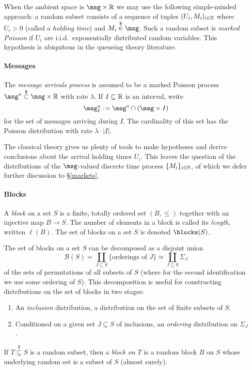\documentclass[a4paper,11pt]{article}
\begin{document}
When the ambient space is $\msg\times\R$ we may use the following simple-minded approach: a random subset consists of a sequence of tuples $(U_i,M_i)_{i\in\mathbb N}$ where $U_i>0$ (called a \emph{holding time}) and $M_i\stackrel{\$}{\in} \msg$.
%
Such a random subset is \emph{marked Poisson} if $U_i$ are i.i.d.~exponentially distributed random variables.
%
This hypothesis is ubiquitous in the queueing theory literature.

\paragraph{Messages}
The \emph{message arrivals process} is assumed to be a marked Poisson process $\msg^a\stackrel{\$}{\subset} \msg\times\R$ with rate $\lambda$.
%
If $I\subseteq\mathbb R$ is an interval, write 
\[
  \msg^a_I\defeq \msg^a\cap (\msg\times I)
\]
for the set of messages arriving during $I$. The cardinality of this set has the Poisson distribution with rate $\lambda\cdot|I|$.

The classical theory gives us plenty of tools to make hypotheses and derive conclusions about the arrival holding times $U_i$. This leaves the question of the distributions of the $\msg$-valued discrete time process $\{M_i\}_{i\in\mathbb N}$, of which we defer further discussion to \S\ref{markets}.

\paragraph{Blocks}

\begin{definition}[Blocks]
  
  A \emph{block} on a set $S$ is a finite, totally ordered set $(B,\leq)$ together with an injective map $B\rightarrow S$. The number of elements in a block is called its \emph{length}, written $\ell(B)$. The set of blocks on a set $S$ is denoted $\blocks(S)$.

\end{definition}  

The set of blocks on a set $S$ can be decomposed as a disjoint union
\[
  \mathcal{B}(S) = \coprod_{J\subseteq S}\{\text{orderings of }J\} \simeq \coprod_{J\subseteq S}\Sigma_J
\]
of the sets of permutations of all subsets of $S$ (where for the second identification we use some ordering of $S$). This decomposition is useful for constructing distributions on the set of blocks in two stages:
\begin{enumerate}
  \item An \emph{inclusion} distribution, a distribution on the set of finite subsets of $S$.
  \item Conditioned on a given set $J\subseteq S$ of inclusions, an \emph{ordering} distribution on $\Sigma_J$.
\end{enumerate}
%
If $T\stackrel{\$}{\subseteq} S$ is a random subset, then a \emph{block on $T$} is a random block $B$ on $S$ whose underlying random set is a subset of $S$ (almost surely).
\end{document}
